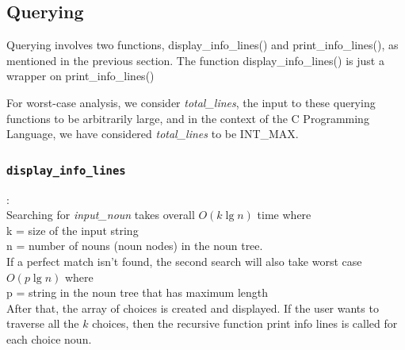 \documentclass[conference]{IEEEtran}
\begin{document}
\subsection{\textbf{Querying}}
Querying involves two functions, display\_info\_lines() and
print\_info\_lines(), as mentioned in the previous section.
The function display\_info\_lines() is just a wrapper on
print\_info\_lines()

For worst-case analysis, we consider \textit{total\_lines}, the input to these querying functions to be arbitrarily large, and in the context of the C Programming Language, we have considered \textit{total\_lines} to be INT\_MAX.


\subsubsection{\textbf{\texttt{display\_info\_lines}}} :
    \\Searching for \textit{input\_noun} takes overall $O(k \lg n)$  time where 
    \\k = size of the input string
    \\n = number of nouns (noun nodes) in the noun tree.
    \\If a perfect match isn’t found, the second search will also
take worst case  $O(p \lg n)$ where
    \\p = string in the noun tree that has maximum length
    \\After that, the array of choices is created and displayed. If
the user wants to traverse all the $k$ choices, then the recursive
function print info lines is called for each choice noun.
\end{document}
